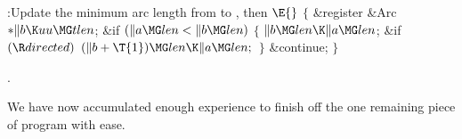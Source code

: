 \B{}:Update the minimum arc length from  to , then
\X${}\E{}$\6
${}\{{}$\5
\1\&{register} \&{Arc} ${}{*}\|b\K\\{uu}\MG\\{tlen}{}$;\7
\&{if} ${}(\|a\MG\\{len}<\|b\MG\\{len}){}$\5
${}\{{}$\1\6
${}\|b\MG\\{len}\K\|a\MG\\{len}{}$;\6
\&{if} ${}(\R\\{directed}){}$\1\5
${}(\|b+\T{1})\MG\\{len}\K\|a\MG\\{len};{}$\2\6
\4${}\}{}$\2\6
\&{continue};\6
\4${}\}{}$\2\par
{}.\fi

We have now accumulated enough experience to finish off the one
remaining piece of program with ease.

